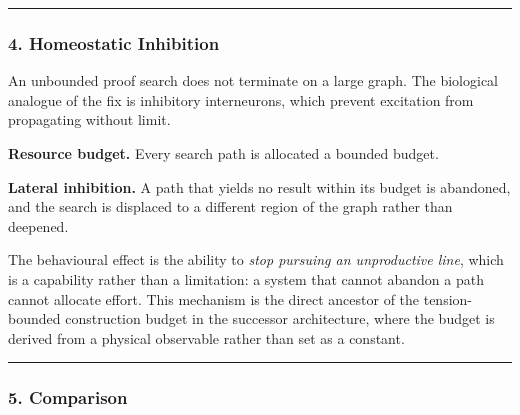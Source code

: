 \documentclass[
  11pt,
  a4paper,
]{article}
\begin{document}
\begin{center}\rule{0.5\linewidth}{0.5pt}\end{center}

\subsubsection{4. Homeostatic Inhibition}\label{homeostatic-inhibition}

An unbounded proof search does not terminate on a large graph. The
biological analogue of the fix is inhibitory interneurons, which prevent
excitation from propagating without limit.

\textbf{Resource budget.} Every search path is allocated a bounded
budget.

\textbf{Lateral inhibition.} A path that yields no result within its
budget is abandoned, and the search is displaced to a different region
of the graph rather than deepened.

The behavioural effect is the ability to \emph{stop pursuing an
unproductive line}, which is a capability rather than a limitation: a
system that cannot abandon a path cannot allocate effort. This mechanism
is the direct ancestor of the tension-bounded construction budget in the
successor architecture, where the budget is derived from a physical
observable rather than set as a constant.

\begin{center}\rule{0.5\linewidth}{0.5pt}\end{center}

\subsubsection{5. Comparison}\label{comparison}
\end{document}
